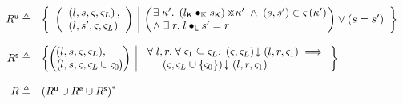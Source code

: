\begin{definition}[Rely]
\[\begin{array}{r l}
	
	\updateR \eqdef & 
	\left\{
	\begin{array}{l | l}
		\left(
		\begin{array}{l}
			\left(l, s, \amod{}, \amod{L} \right),\\
			\left(l, s', \amod{}, \amod{L}\right)
		\end{array}
		\right)
		&
		\left(
		\hspace*{-0.15cm}
		\begin{array}{l}
			\exsts{\ca{}'} \left( \capPart{l} \composeCap \capPart{s} \right) \separate \ca{}' \;\land\; (s, s') \in \amod{} \left(\ca{}'\right) \\
			\land\; \exsts{r} l \composeL s' = r
		\end{array}
		\hspace*{-0.15cm}
		\right)
		\lor
		(s = s')
	\end{array}	
	\right\}\\\\
	
	
	\shiftR \eqdef & 
	\left\{
 	\hspace*{-0.2cm}
	 \begin{array}{l | r}
	   \left(
	   \hspace*{-0.2cm}
	   \begin{array}{l}
	     (l, s, \amod{}, \amod{L}),\\
 	     \left(
	     \hspace*{-0.2cm}
	     \begin{array}{l}
	      l,
	      s,
	      \amod{}, \amod{L} \cup \amod{0}
	     \end{array}
 	    \hspace*{-0.2cm}
 	    \right)
	   \end{array}
	   \hspace*{-0.2cm}
 	  \right)
	   &
 	  \begin{array}{l}
 	  	\for{l, r} \for{\amod{1} \subseteq \amod{L}} \extendsAM{\amod{}, \amod{L}}{l}{r}{\amod{1}} \implies \\
 	  	\hspace*{0.5cm}\extendsAM{\amod{}, \amod{L} \cup \{\amod{0}\}}{l}{r}{\amod{1}}
			
   	\end{array}
 	\end{array}
 	\hspace*{-0.2cm}
	\right\}\\\\
	
	\rely \eqdef & \left(\updateR \cup \extendR \cup \shiftR \right)^{*}
\end{array}
\]
%
\end{definition}

